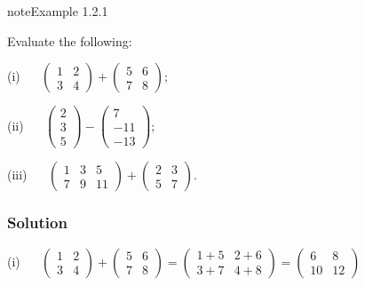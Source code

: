 \documentclass[letterpaper,10pt,english]{jupyterBook}
\begin{document}
\begin{sphinxadmonition}{note}{Example 1.2.1}



\sphinxAtStartPar
Evaluate the following:

\sphinxAtStartPar
(i)   \(\begin{pmatrix} 1 & 2 \\ 3 & 4 \end{pmatrix} + \begin{pmatrix} 5 & 6 \\ 7 & 8 \end{pmatrix}\);

\sphinxAtStartPar
(ii)   \(\begin{pmatrix} 2 \\ 3 \\ 5 \end{pmatrix} - \begin{pmatrix} 7 \\ -11 \\ -13 \end{pmatrix}\);

\sphinxAtStartPar
(iii)   \(\begin{pmatrix} 1 & 3 & 5 \\ 7 & 9 & 11 \end{pmatrix} + \begin{pmatrix}2 & 3 \\ 5 & 7 \end{pmatrix}\).
\subsubsection*{Solution}

\sphinxAtStartPar
(i)   \( \begin{pmatrix} 1 & 2 \\ 3 & 4 \end{pmatrix} + \begin{pmatrix} 5 & 6 \\ 7 & 8 \end{pmatrix} = \begin{pmatrix} 1 + 5 & 2 + 6 \\ 3 + 7 & 4 + 8 \end{pmatrix}= \begin{pmatrix}6 & 8 \\ 10 & 12 \end{pmatrix} \)


\end{sphinxadmonition}
\end{document}
